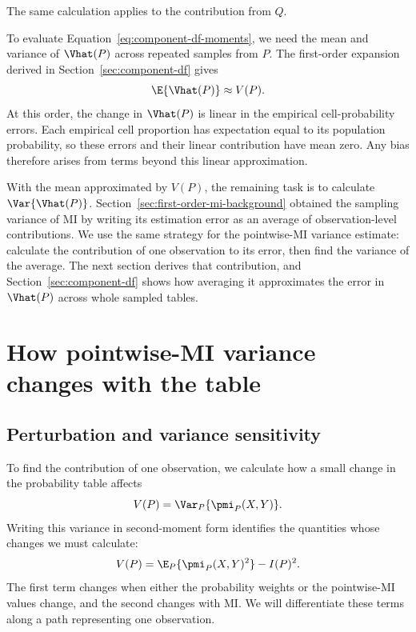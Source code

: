 The same calculation applies to the contribution from \(Q\).

To evaluate Equation~\eqref{eq:component-df-moments}, we need the mean and
variance of \(\Vhat(P)\) across repeated samples from \(P\). The first-order
expansion derived in Section~\ref{sec:component-df} gives
\begin{equation*}
  \E\{\Vhat(P)\}\approx V(P).
\end{equation*}
At this order, the change in \(\Vhat(P)\) is linear in the empirical
cell-probability errors. Each empirical cell proportion has expectation
equal to its population probability, so these errors and their linear
contribution have mean zero. Any bias therefore arises from terms beyond
this linear approximation.

With the mean approximated by \(V(P)\), the remaining task is to
calculate \(\Var\{\Vhat(P)\}\). Section~\ref{sec:first-order-mi-background}
obtained the sampling variance of MI by writing its estimation error as
an average of observation-level contributions. We use the same strategy
for the pointwise-MI variance estimate: calculate the contribution of one
observation to its error, then find the variance of the average. The next
section derives that contribution, and Section~\ref{sec:component-df}
shows how averaging it approximates the error in \(\Vhat(P)\) across
whole sampled tables.

\section{How pointwise-MI variance changes with the table}

\subsection{Perturbation and variance sensitivity}

To find the contribution of one observation, we calculate how a small
change in the probability table affects
\begin{equation}
  V(P)
  =\Var_P\{\pmi_P(X,Y)\}.
\end{equation}
Writing this variance in second-moment form identifies the quantities
whose changes we must calculate:
\begin{equation}
  V(P)=\E_P\{\pmi_P(X,Y)^2\}-I(P)^2.
  \label{eq:v-second-moment}
\end{equation}
The first term changes when either the probability weights or the
pointwise-MI values change, and the second changes with MI. We will
differentiate these terms along a path representing one observation.

